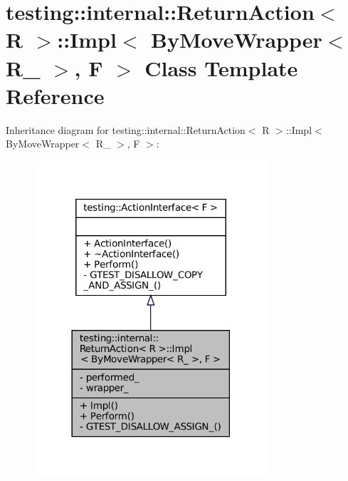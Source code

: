 \hypertarget{classtesting_1_1internal_1_1ReturnAction_1_1Impl_3_01ByMoveWrapper_3_01R___01_4_00_01F_01_4}{}\section{testing\+:\+:internal\+:\+:Return\+Action$<$ R $>$\+:\+:Impl$<$ By\+Move\+Wrapper$<$ R\+\_\+ $>$, F $>$ Class Template Reference}
\label{classtesting_1_1internal_1_1ReturnAction_1_1Impl_3_01ByMoveWrapper_3_01R___01_4_00_01F_01_4}


Inheritance diagram for testing\+:\+:internal\+:\+:Return\+Action$<$ R $>$\+:\+:Impl$<$ By\+Move\+Wrapper$<$ R\+\_\+ $>$, F $>$\+:
\nopagebreak
\begin{figure}[H]
\begin{center}
\leavevmode
\includegraphics[width=246pt]{classtesting_1_1internal_1_1ReturnAction_1_1Impl_3_01ByMoveWrapper_3_01R___01_4_00_01F_01_4__inherit__graph}
\end{center}
\end{figure}


